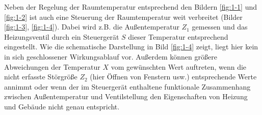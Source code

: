 Neben der Regelung der Raumtemperatur entsprechend den Bildern \ref{fig:1-1} und \ref{fig:1-2} ist auch eine Steuerung der Raumtemperatur weit verbreitet (Bilder \ref{fig:1-3}, \ref{fig:1-4}).
Dabei wird z.B. die Außentemperatur \(Z_1\) gemessen und das Heizungsventil durch ein Steuergerät \(S\) dieser Temperatur entsprechend eingestellt.
Wie die schematische Darstellung in Bild \ref{fig:1-4} zeigt, liegt hier kein in sich geschlossener Wirkungsablauf vor.
Außerdem können größere Abweichungen der Temperatur \(X\) vom gewünschten Wert auftreten, wenn die nicht erfasste Störgröße \(Z_2\) (hier Öffnen von Fenstern usw.) entsprechende Werte annimmt oder wenn der im Steuergerät enthaltene funktionale Zusammenhang zwischen Außentemperatur und Ventilstellung den Eigenschaften von Heizung und Gebäude nicht genau entspricht.
